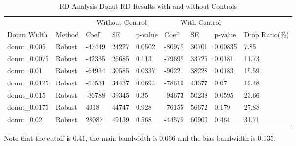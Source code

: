 \begin{table}[ht]
\centering
\caption{RD Analysis Donut RD Results with and without Controls} 
\label{tab:rd_robust_results}
\begin{tabular}{lllllllll}
  \hline
 &  & \multicolumn{3}{c}{Without Control} & \multicolumn{3}{c}{With Control} & \\
Donut Width & Method & Coef & SE & p-value & Coef & SE & p-value & Drop Ratio(\%) \\ 
  \hline
donut\_0.005 & Robust & -47449 & 24227 & 0.0502 & -80978 & 30701 & 0.00835 & 7.85 \\ 
  donut\_0.0075 & Robust & -42335 & 26685 & 0.113 & -79698 & 33726 & 0.0181 & 11.73 \\ 
  donut\_0.01 & Robust & -64934 & 30585 & 0.0337 & -90221 & 38228 & 0.0183 & 15.59 \\ 
  donut\_0.0125 & Robust & -62531 & 34437 & 0.0694 & -78610 & 43377 & 0.07 & 19.48 \\ 
  donut\_0.015 & Robust & -36788 & 39345 & 0.35 & -94673 & 50238 & 0.0595 & 23.66 \\ 
  donut\_0.0175 & Robust & 4018 & 44747 & 0.928 & -76155 & 56672 & 0.179 & 27.88 \\ 
  donut\_0.02 & Robust & 28087 & 49139 & 0.568 & -44578 & 60900 & 0.464 & 31.71 \\ 
   \hline
\end{tabular}
Note that the cutoff is 0.41, the main bandwidth is 0.066 and the bias bandwidth is 0.135.

\end{table}

